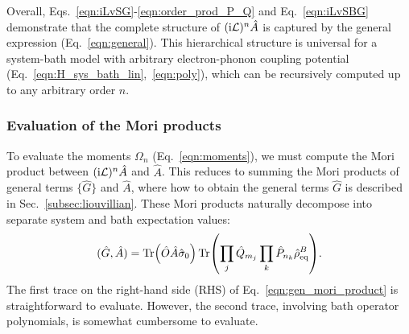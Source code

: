 \documentclass[preprint,aip,jcp]{revtex4-2}
\newcommand{\im}{\textup{i}}
\newcommand{\Lv}{\mathcal{L}}
\begin{document}
Overall, Eqs.~\ref{eqn:iLvSG}-\ref{eqn:order_prod_P_Q} and Eq.~\ref{eqn:iLvSBG} demonstrate that the complete structure of $(\im \Lv)^n \hat{A}$ is captured by the general expression (Eq.~\ref{eqn:general}). This hierarchical structure is universal for a system-bath model with arbitrary electron-phonon coupling potential (Eq.~\ref{eqn:H_sys_bath_lin},~\ref{eqn:poly}), which can be recursively computed up to any arbitrary order $n$.

\subsubsection{Evaluation of the Mori products \label{subsec:expval}}
To evaluate the moments $\Omega_n$ (Eq.~\ref{eqn:moments}), we must compute the Mori product between $(\im\Lv)^n \hat{A}$ and $\hat{A}$. This reduces to summing the Mori products of general terms $\{\hat{G}\}$ and $\hat{A}$, where how to obtain the general terms $\hat{G}$ is described in Sec.~\ref{subsec:liouvillian}. These Mori products naturally decompose into separate system and bath expectation values:
\begin{equation}\label{eqn:gen_mori_product}
    (\hat{G}, \hat{A}) = \Tr(\hat{O} \hat{A} \hat{\sigma}_0)\Tr(\prod_{j} \hat{Q}_{m_j} \prod_{k} \hat{P}_{n_k} \hat{\rho}_\text{eq}^{B}).
\end{equation}
The first trace on the right-hand side (RHS) of Eq.~\ref{eqn:gen_mori_product} is straightforward to evaluate. However, the second trace, involving bath operator polynomials, is somewhat cumbersome to evaluate.
\end{document}
